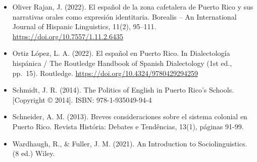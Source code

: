 \documentclass[
  a4paper,
  11pt,
  twocolumn]{article}
\begin{document}
\begin{itemize}
\item
  Oliver Rajan, J. (2022). El español de la zona cafetalera de Puerto
  Rico y sus narrativas orales como expresión identitaria. Borealis --
  An International Journal of Hispanic Linguistics, 11(2), 95--111.
  \url{https://doi.org/10.7557/1.11.2.6435}
\item
  Ortiz López, L. A. (2022). El español en Puerto Rico. In Dialectología
  hispánica / The Routledge Handbook of Spanish Dialectology (1st ed.,
  pp.~15). Routledge. \url{https://doi.org/10.4324/9780429294259}
\item
  Schmidt, J. R. (2014). The Politics of English in Puerto Rico's
  Schools. {[}Copyright © 2014{]}. ISBN: 978-1-935049-94-4
\item
  Schneider, A. M. (2013). Breves consideraciones sobre el sistema
  colonial en Puerto Rico. Revista História: Debates e Tendências,
  13(1), páginas 91-99.
\item
  Wardhaugh, R., \& Fuller, J. M. (2021). An Introduction to
  Sociolinguistics. (8 ed.) Wiley.
\end{itemize}




\theendnotes
\end{document}
